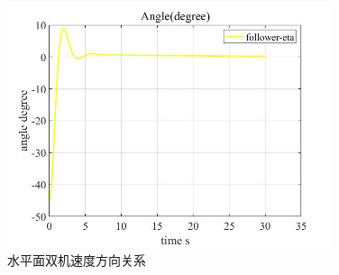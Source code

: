 \begin{figure}[H]
    \centering
    \includegraphics[width=0.85\textwidth]{figures/c5/c5-matlab-eta}
    \caption{水平面双机速度方向关系}\label{fig:c5-matlab-eta}
\end{figure}


